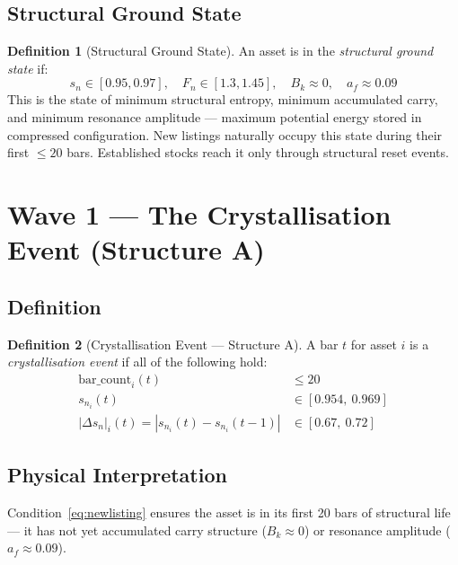 \documentclass[11pt, a4paper]{article}
\newcommand{\Fn}{F_n}
\newcommand{\sn}{s_n}
\newcommand{\Bk}{B_k}
\newcommand{\dsn}{|\Delta s_n|}
\theoremstyle{definition}
\newtheorem{definition}{Definition}
\begin{document}
\subsection{Structural Ground State}

\begin{definition}[Structural Ground State]
An asset is in the \emph{structural ground state} if:
\[
  \sn \in [0.95, 0.97], \quad \Fn \in [1.3, 1.45], \quad \Bk \approx 0,
  \quad a_f \approx 0.09
\]
This is the state of minimum structural entropy, minimum accumulated carry,
and minimum resonance amplitude — maximum potential energy stored in
compressed configuration.
New listings naturally occupy this state during their first $\leq 20$ bars.
Established stocks reach it only through structural reset events.
\end{definition}

\section{Wave 1 — The Crystallisation Event (Structure A)}

\subsection{Definition}

\begin{definition}[Crystallisation Event — Structure A]
\label{def:structA}
A bar $t$ for asset $i$ is a \emph{crystallisation event} if all of the
following hold:
\begin{align}
  \text{bar\_count}_i(t) &\leq 20 \label{eq:newlisting} \\
  \sn_i(t) &\in [0.954,\ 0.969] \label{eq:ordered} \\
  \dsn_i(t) = |\sn_i(t) - \sn_i(t-1)| &\in [0.67,\ 0.72] \label{eq:jump}
\end{align}
\end{definition}

\subsection{Physical Interpretation}

Condition~\eqref{eq:newlisting} ensures the asset is in its first 20 bars of
structural life — it has not yet accumulated carry structure ($\Bk \approx 0$)
or resonance amplitude ($a_f \approx 0.09$).
\end{document}
